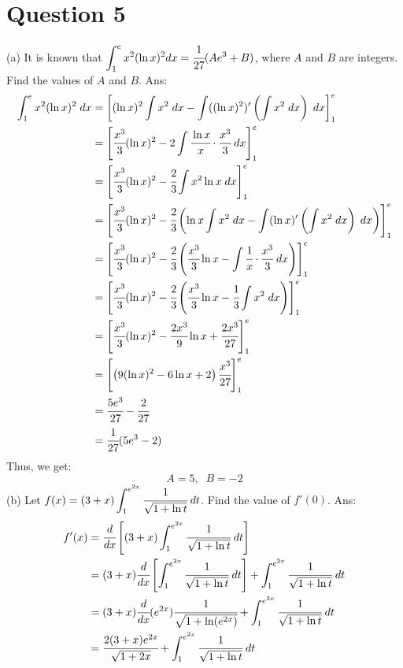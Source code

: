 \documentclass{article}
\begin{document}
\newpage
\section*{Question 5}
(a) It is known that $\displaystyle\int_1^e x^2 (\ln x)^2 dx = \cfrac{1}{27} (Ae^3 + B)$, where $A$ and $B$ are integers. Find the values
of $A$ and $B$.
\newline
\newline
Ans:
\begin{align*}
    \displaystyle\int_1^e x^2 (\ln x)^2 \; dx
    &= \left[  (\ln x)^2 \displaystyle\int x^2 \; dx - \displaystyle\int ((\ln x)^2)' \left(\displaystyle\int x^2  \; dx\right) \; dx  \right]^e_1 \\
    &= \left[  \cfrac{x^3}{3}(\ln x)^2  - 2 \displaystyle\int \cfrac{\ln x}{x} \cdot \cfrac{x^3}{3} \; dx  \right]^e_1 \\
    &= \left[  \cfrac{x^3}{3}(\ln x)^2  - \cfrac{2}{3} \displaystyle\int x^2 \ln x \; dx  \right]^e_1 \\
    &= \left[  \cfrac{x^3}{3}(\ln x)^2  - \cfrac{2}{3} \left(
     \ln x \displaystyle\int x^2 \; dx - \displaystyle\int ( \ln x)' \left(\displaystyle\int x^2 \; dx \right) \; dx
    \right)  \right]^e_1 \\
    &= \left[  \cfrac{x^3}{3}(\ln x)^2  - \cfrac{2}{3} \left(
    \cfrac{x^3}{3} \ln x  - \displaystyle\int \cfrac{1}{x} \cdot \cfrac{x^3}{3} \; dx
    \right)  \right]^e_1 \\
    &= \left[  \cfrac{x^3}{3}(\ln x)^2  - \cfrac{2}{3} \left(
    \cfrac{x^3}{3} \ln x  - \cfrac{1}{3} \displaystyle\int x^2 \; dx
    \right)  \right]^e_1 \\
    &= \left[  \cfrac{x^3}{3}(\ln x)^2  - \cfrac{2x^3}{9} \ln x + \cfrac{2x^3}{27} \right]^e_1 \\
    &= \left[  \left(9(\ln x)^2  - 6 \ln x + 2\right) \cfrac{x^3}{27} \right]^e_1 \\
    &= \cfrac{5 e^3}{27} - \cfrac{2}{27} \\
    &= \cfrac{1}{27}( 5 e^3 - 2) \\
\end{align*}
Thus, we get:
$$A = 5, \;\; B = -2$$
\newline
\newline
(b) Let $f(x) = (3+x)\displaystyle\int_1^{e^{2x}} \cfrac{1}{\sqrt{1+\ln t}} \; dt$. Find the value of $f'(0)$.
\newline
\newline
Ans:
\begin{align*}
    f'(x)
    &= \cfrac{d}{dx} \left[(3+x)\displaystyle\int_1^{e^{2x}} \cfrac{1}{\sqrt{1+\ln t}} \; dt \right] \\
    &= (3+x) \cfrac{d}{dx} \left[\displaystyle\int_1^{e^{2x}} \cfrac{1}{\sqrt{1+\ln t}} \; dt \right] + \displaystyle\int_1^{e^{2x}} \cfrac{1}{\sqrt{1+\ln t}} \; dt\\
    &= (3+x) \cfrac{d}{dx} (e^{2x}) \cfrac{1}{\sqrt{1+\ln (e^{2x})}} + \displaystyle\int_1^{e^{2x}} \cfrac{1}{\sqrt{1+\ln t}} \; dt \\
    &= \cfrac{2(3+x)e^{2x} }{\sqrt{1+2x}} + \displaystyle\int_1^{e^{2x}} \cfrac{1}{\sqrt{1+\ln t}} \; dt
\end{align*}
\end{document}

